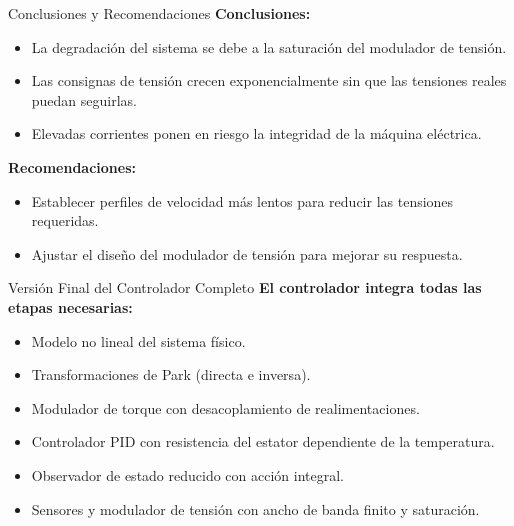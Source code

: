 \documentclass[12pt]{beamer}
\begin{document}
\begin{frame}{Conclusiones y Recomendaciones}
    \textbf{Conclusiones:}
    \begin{itemize}
        \item La degradación del sistema se debe a la saturación del modulador de tensión.
        \item Las consignas de tensión crecen exponencialmente sin que las tensiones reales puedan seguirlas.
        \item Elevadas corrientes ponen en riesgo la integridad de la máquina eléctrica.
    \end{itemize}
    
    \textbf{Recomendaciones:}
    \begin{itemize}
        \item Establecer perfiles de velocidad más lentos para reducir las tensiones requeridas.
        \item Ajustar el diseño del modulador de tensión para mejorar su respuesta.
    \end{itemize}
\end{frame}


\begin{frame}{Versión Final del Controlador Completo}
    \textbf{El controlador integra todas las etapas necesarias:}
    \begin{itemize}
        \item Modelo no lineal del sistema físico.
        \item Transformaciones de Park (directa e inversa).
        \item Modulador de torque con desacoplamiento de realimentaciones.
        \item Controlador PID con resistencia del estator dependiente de la temperatura.
        \item Observador de estado reducido con acción integral.
        \item Sensores y modulador de tensión con ancho de banda finito y saturación.
    \end{itemize}
\end{frame}
\end{document}
